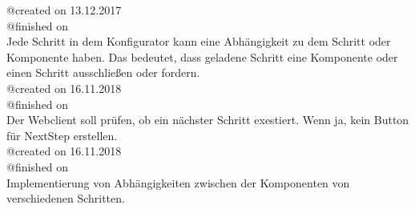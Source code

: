 \documentclass{article}
\begin{document}
@created on 13.12.2017\\
@finished on \\
Jede Schritt in dem Konfigurator kann eine Abhängigkeit zu dem Schritt oder
Komponente haben. Das bedeutet, dass geladene Schritt eine Komponente oder einen
Schritt ausschlie\ss{}en oder fordern.\\

@created on 16.11.2018\\
@finished on \\
Der Webclient soll prüfen, ob ein nächster Schritt exestiert. Wenn ja, kein Button für NextStep erstellen.\\

@created on 16.11.2018\\
@finished on \\
Implementierung von Abhängigkeiten zwischen der Komponenten von verschiedenen Schritten.
\end{document}
